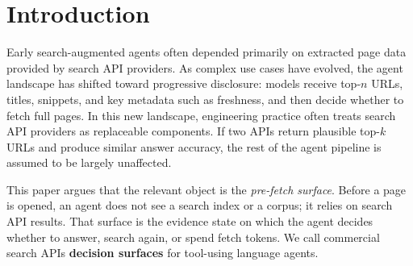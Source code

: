 \begin{abstract}
Search APIs expose ranked snippets, URLs, and metadata on which agents decide whether to answer, search again, or fetch pages. We evaluate these interfaces as \emph{decision surfaces} on a fixed sample of \NQueries{} questions from the 254-question \textsc{SealQA-Hard} subset, using one frozen GPT-5.4 agent, a fixed orchestration harness, and a shared page-fetch backend across Brave, Tavily, and Firecrawl. A Kimi-K2.6 oracle labels visible URL-level evidence; a separate answer audit yields \BraveCorrect{}, \TavilyCorrect{}, and \FirecrawlCorrect{} correct answers out of 100. These counts indicate similar observed accuracy but do not establish equivalence. Under the tested configurations, Brave exposes more pre-fetch support alongside a larger snippet surface; Tavily has a larger rank-1 share among trajectory-pooled supporting observations; and Firecrawl is associated with broader exploration. First-search query-level metrics distinguish support availability from ranking, while contradiction exposure complements contradiction-to-gold ratios. A retrospective oracle union covers 44/100 questions, versus 26/100 for the best individual provider: 18 percentage points of headroom. The observed evidence and action differences motivate evaluating search APIs jointly with agent policy and retrieval budget.
\end{abstract}

\section{Introduction}

Early search-augmented agents often depended primarily on extracted page data provided by search API providers. As complex use cases have evolved, the agent landscape has shifted toward progressive disclosure: models receive top-$n$ URLs, titles, snippets, and key metadata such as freshness, and then decide whether to fetch full pages. In this new landscape, engineering practice often treats search API providers as replaceable components. If two APIs return plausible top-$k$ URLs and produce similar answer accuracy, the rest of the agent pipeline is assumed to be largely unaffected.

This paper argues that the relevant object is the \emph{pre-fetch surface}. Before a page is opened, an agent does not see a search index or a corpus; it relies on search API results. That surface is the evidence state on which the agent decides whether to answer, search again, or spend fetch tokens. We call commercial search APIs \textbf{decision surfaces} for tool-using language agents.

